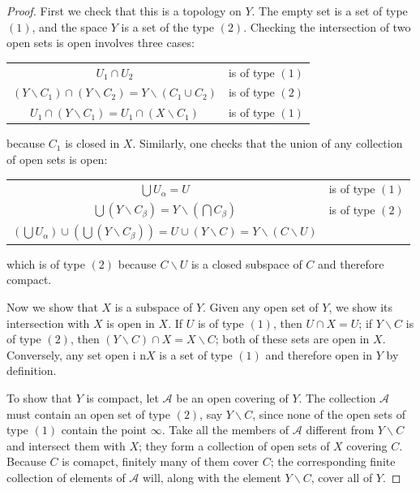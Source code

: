\documentclass[12pt, a4paper, oneside, openright, titlepage]{book}
\begin{document}
\begin{proof}
    First we check that this is a topology on $Y$. The empty set is a set of type $(1)$, and the space $Y$ is a set of the type $(2)$. Checking the intersection of two open sets is open involves three cases: 
    \begin{table}[H]
        \centering
        \begin{tabular}{cc}
            $U_1\cap U_2$ & is of type $(1)$ \\
            $(Y\backslash C_1)\cap (Y\backslash C_2) = Y\backslash (C_1\cup C_2)$ & is of type $(2)$ \\
            $U_1\cap (Y\backslash C_1) = U_1\cap (X\backslash C_1)$ & is of type $(1)$ \\
        \end{tabular}
    \end{table}
    because $C_1$ is closed in $X$. Similarly, one checks that the union of any collection of open sets is open: 
    \begin{table}[H]
        \centering
        \begin{tabular}{cc}
            $\bigcup U_{\alpha} = U$ & is of type $(1)$ \\
            $\bigcup(Y\backslash C_{\beta}) = Y\backslash \left(\bigcap C_{\beta}\right)$ & is of type $(2)$ \\
            $\left(\bigcup U_{\alpha}\right)\cup\left(\bigcup(Y\backslash C_{\beta})\right) = U\cup(Y\backslash C) = Y\backslash(C\backslash U)$ &  \\
        \end{tabular}
    \end{table}
    which is of type $(2)$ because $C\backslash U$ is a closed subspace of $C$ and therefore compact.

    Now we show that $X$ is a subspace of $Y$. Given any open set of $Y$, we show its intersection with $X$ is open in $X$. If $U$ is of type $(1)$, then $U\cap X = U$; if $Y\backslash C$ is of type $(2)$, then $(Y\backslash C)\cap X = X\backslash C$; both of these sets are open in $X$. Conversely, any set open i n$X$ is a set of type $(1)$ and therefore open in $Y$ by definition. 

    To show that $Y$ is compact, let $\mathcal{A}$ be an open covering of $Y$. The collection $\mathcal{A}$ must contain an open set of type $(2)$, say $Y\backslash C$, since none of the open sets of type $(1)$ contain the point $\infty$. Take all the members of $\mathcal{A}$ different from $Y\backslash C$ and intersect them with $X$; they form a collection of open sets of $X$ covering $C$. Because $C$ is comapct, finitely many of them cover $C$; the corresponding finite collection of elements of $\mathcal{A}$ will, along with the element $Y\backslash C$, cover all of $Y$.


\end{proof}
\end{document}

